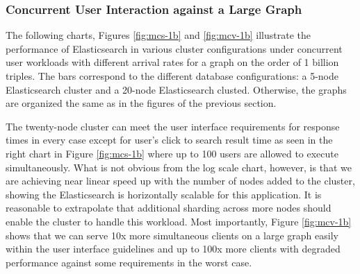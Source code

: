 \subsubsection{Concurrent User Interaction against a Large Graph}
The following charts, Figures \ref{fig:mcs-1b} and \ref{fig:mcv-1b} illustrate the performance of Elasticsearch in various cluster configurations under concurrent user workloads with different arrival rates for a graph on the order of 1 billion triples. 
The bars correspond to the different database configurations: a 5-node Elasticsearch cluster and a 20-node Elasticsearch clusted. 
Otherwise, the graphs are organized the same as in the figures of the previous section.

The twenty-node cluster can meet the user interface requirements for response times in every case except for user's click to search result time as seen in the right chart in Figure \ref{fig:mcs-1b} where up to 100 users are allowed to execute simultaneously.  
What is not obvious from the log scale chart, however, is that we are achieving near linear speed up with the number of nodes added to the cluster, showing the Elasticsearch is horizontally scalable for this application.
It is reasonable to extrapolate that additional sharding across more nodes should enable the cluster to handle this workload.
Most importantly, Figure \ref{fig:mcv-1b} shows that we can serve 10x more simultaneous clients on a large graph easily within the user interface guidelines and up to 100x more clients with degraded performance against some requirements in the worst case.  

